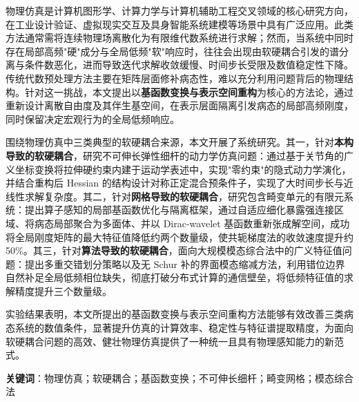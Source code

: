\cleardoublepage
{}

物理仿真是计算机图形学、计算力学与计算机辅助工程交叉领域的核心研究方向，在工业设计验证、虚拟现实交互及具身智能系统建模等场景中具有广泛应用。此类方法通常需将连续物理场离散化为有限维代数系统进行求解；然而，当系统中同时存在局部高频"硬"成分与全局低频"软"响应时，往往会出现由软硬耦合引发的谱分离与条件数恶化，进而导致迭代求解收敛缓慢、时间步长受限及数值稳定性下降。传统代数预处理方法主要在矩阵层面修补病态性，难以充分利用问题背后的物理结构。针对这一挑战，本文提出以\textbf{基函数变换与表示空间重构}为核心的方法论，通过重新设计离散自由度及其伴生基空间，在表示层面隔离引发病态的局部高频刚度，同时保留决定宏观行为的全局低频响应。

围绕物理仿真中三类典型的软硬耦合来源，本文开展了系统研究。其一，针对\textbf{本构导致的软硬耦合}，研究不可伸长弹性细杆的动力学仿真问题：通过基于关节角的广义坐标变换将拉伸硬约束内建于运动学表述中，实现"零约束"的隐式动力学演化，并结合重构后 Hessian 的结构设计对称正定混合预条件子，实现了大时间步长与近线性求解复杂度。其二，针对\textbf{网格导致的软硬耦合}，研究包含畸变单元的有限元系统：提出算子感知的局部基函数优化与隔离框架，通过自适应细化暴露强连接区域、将病态局部聚合为多面体、并以 Dirac-wavelet 基函数重新张成解空间，成功将全局刚度矩阵的最大特征值降低约两个数量级，使共轭梯度法的收敛速度提升约50\%。其三，针对\textbf{算法导致的软硬耦合}，面向大规模模态综合法中的广义特征值问题：提出多重交错划分策略以及无 Schur 补的界面模态缩减方法，利用错位边界自然补足全局低频相位缺失，彻底打破分布式计算的通信壁垒，将低频特征值的求解精度提升三个数量级。

实验结果表明，本文所提出的基函数变换与表示空间重构方法能够有效改善三类病态系统的数值条件，显著提升仿真的计算效率、稳定性与特征谱提取精度，为面向软硬耦合问题的高效、健壮物理仿真提供了一种统一且具有物理感知能力的新范式。

\bigskip
\noindent \textbf{关键词}：物理仿真；软硬耦合；基函数变换；不可伸长细杆；畸变网格；模态综合法

\cleardoublepage
{}

